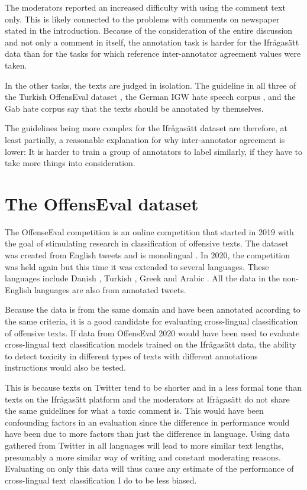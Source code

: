 \documentclass[nofilelist]{cslthse-msc}
\begin{document}
The moderators reported an increased difficulty with using the comment text only. This is likely connected to the problems with comments on newspaper stated in the introduction. Because of the consideration of the entire discussion and not only a comment in itself, the annotation task is harder for the Ifrågasätt data than for the tasks for which reference inter-annotator agreement values were taken. 

In the other tasks, the texts are judged in isolation. The guideline in all three of the Turkish OffensEval dataset \citep{turkoffensive}, the German IGW hate speech corpus \citep{DBLP:journals/corr/RossRCCKW17}, and the Gab hate corpus \citep{kennedy_atari} say that the texts should be annotated by themselves. 

The guidelines being more complex for the Ifrågasätt dataset are therefore, at least partially, a reasonable explanation for why inter-annotator agreement is lower: It is harder to train a group of annotators to label similarly, if they have to take more things into consideration.

\section{The OffensEval dataset}

The OffenseEval competition is an online competition that started in 2019 with the goal of stimulating research in classification of offensive texts. The dataset was created from English tweets and is monolingual \citep{zampieri2019semeval}. In 2020, the competition was held again but this time it was extended to several languages. These languages include  Danish \citep{danishoffensive}, Turkish \citep{turkoffensive}, Greek \citep{greekoffensive} and Arabic \citep{araboffensive}. All the data in the non-English languages are also from annotated tweets.

Because the data is from the same domain and have been annotated according to the same criteria, it is a good candidate for evaluating cross-lingual classification of offensive texts. If data from OffensEval 2020 would have been used to evaluate cross-lingual text classification models trained on the Ifrågasätt data, the ability to detect toxicity in different types of texts with different annotations instructions would also be tested. 

This is because texts on Twitter tend to be shorter and in a less formal tone than texts on the Ifrågasätt platform and the moderators at Ifrågasätt do not share the same guidelines for what a toxic comment is. This would have been confounding factors in an evaluation since the difference in performance would have been due to more factors than just the difference in language. Using data gathered from Twitter in all languages will lead to more similar text lengths, presumably a more similar way of writing and constant moderating reasons. Evaluating on only this data will thus cause any estimate of the performance of cross-lingual text classification I do to be less biased.
\end{document}
